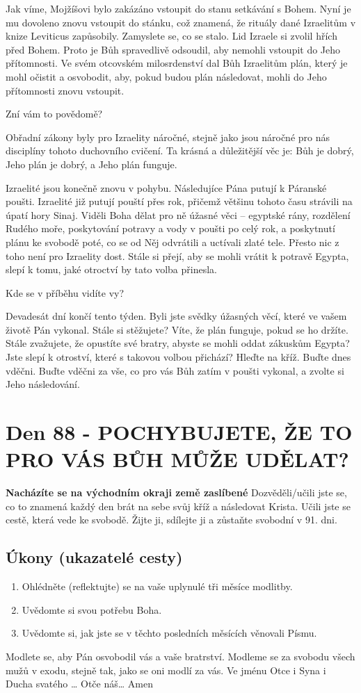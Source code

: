 \documentclass[11pt]{article}
\newcommand{\zacatekTrinactyTyden}{
\textbf{Nacházíte se na východním okraji země zaslíbené} \newline 
Dozvěděli/učili jste se, co to znamená každý den brát na sebe svůj kříž a následovat Krista. Učili jste se cestě, která vede ke svobodě. Žijte ji, sdílejte ji a zůstaňte svobodní v 91. dni.

\subsection*{Úkony (ukazatelé cesty)}
\begin{enumerate}
  \item Ohlédněte (reflektujte) se na vaše uplynulé tři měsíce modlitby.
  \item Uvědomte si svou potřebu Boha.
  \item Uvědomte si, jak jste se v těchto posledních měsících věnovali Písmu.
\end{enumerate}
Modlete se, aby Pán osvobodil vás a vaše bratrství. \newline
Modleme se za svobodu všech mužů v exodu, stejně tak, jako se oni modlí za vás.\newline
Ve jménu Otce i Syna i Ducha svatého …  Otče náš… Amen
}
\begin{document}
Jak víme, Mojžíšovi bylo zakázáno vstoupit do stanu setkávání s Bohem. Nyní je mu dovoleno znovu
vstoupit do stánku, což znamená, že rituály dané Izraelitům v knize Leviticus zapůsobily. Zamyslete se, co se
stalo. Lid Izraele si zvolil hřích před Bohem. Proto je Bůh spravedlivě odsoudil, aby nemohli vstoupit do
Jeho přítomnosti. Ve svém otcovském milosrdenství dal Bůh Izraelitům plán, který je mohl očistit a
osvobodit, aby, pokud budou plán následovat, mohli do Jeho přítomnosti znovu vstoupit.

Zní vám to povědomě?

Obřadní zákony byly pro Izraelity náročné, stejně jako jsou náročné pro nás disciplíny tohoto duchovního
cvičení. Ta krásná a důležitější věc je: Bůh je dobrý, Jeho plán je dobrý, a Jeho plán funguje.

Izraelité jsou konečně znovu v pohybu. Následujíce Pána putují k Páranské poušti. Izraelité již putují pouští
přes rok, přičemž většinu tohoto času strávili na úpatí hory Sinaj. Viděli Boha dělat pro ně úžasné věci –
egyptské rány, rozdělení Rudého moře, poskytování potravy a vody v poušti po celý rok, a poskytnutí plánu
ke svobodě poté, co se od Něj odvrátili a uctívali zlaté tele. Přesto nic z toho není pro Izraelity dost. Stále si
přejí, aby se mohli vrátit k potravě Egypta, slepí k tomu, jaké otroctví by tato volba přinesla.

Kde se v příběhu vidíte vy?

Devadesát dní končí tento týden. Byli jste svědky úžasných věcí, které ve vašem životě Pán vykonal. Stále si
stěžujete? Víte, že plán funguje, pokud se ho držíte. Stále zvažujete, že opustíte své bratry, abyste se mohli
oddat zákuskům Egypta? Jste slepí k otroství, které s takovou volbou přichází? Hleďte na kříž. Buďte dnes
vděčni. Buďte vděčni za vše, co pro vás Bůh zatím v poušti vykonal, a zvolte si Jeho následování.


\newpage
\section{Den 88 - POCHYBUJETE, ŽE TO PRO VÁS BŮH MŮŽE UDĚLAT?}
\zacatekTrinactyTyden
\end{document}
